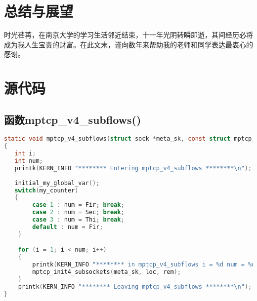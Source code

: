 \documentclass[macfonts,phd,oneside,nobackinfo]{njuthesis}
\begin{document}
\chapter{总结与展望}



\begin{acknowledgement}
时光荏苒，在南京大学的学习生活邻近结束，十一年光阴转瞬即逝，其间经历必将成为我人生宝贵的财富。在此文末，谨向数年来帮助我的老师和同学表达最衷心的感谢。

\end{acknowledgement}








\appendix
\chapter{源代码}\label{app:1}
\section{函数mptcp\_v4\_subflows()}
\begin{lstlisting}[language=C]
static void mptcp_v4_subflows(struct sock *meta_sk, const struct mptcp_loc4 *loc, struct mptcp_rem4 *rem)
{
   int i;
   int num;
   printk(KERN_INFO "******** Entering mptcp_v4_subflows ********\n");
  
   initial_my_global_var();
   switch(my_counter)
   {   
		case 1 : num = Fir; break;
		case 2 : num = Sec; break;
		case 3 : num = Thi; break;
		default : num = Fir;
	}

	for (i = 1; i < num; i++) 
	{
		printk(KERN_INFO "******** in mptcp_v4_subflows i = %d num = %d********\n",i,num);
		mptcp_init4_subsockets(meta_sk, loc, rem);
	}
	printk(KERN_INFO "******** Leaving mptcp_v4_subflows ********\n");
}
\end{lstlisting} 

\backmatter



\end{document}
